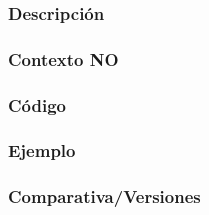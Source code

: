 \subsubsection{Descripci\'on} 
\subsubsection{Contexto NO} 
\newpage
\subsubsection{C\'odigo} 

\newpage
\subsubsection{Ejemplo} 
\subsubsection{Comparativa/Versiones} 